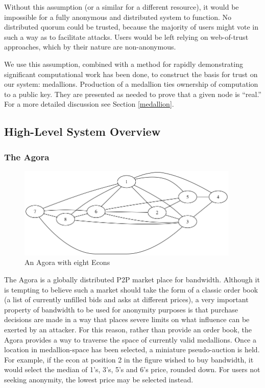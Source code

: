 \documentclass{article}
\begin{document}
Without this assumption (or a similar for a different resource), it would be impossible for a fully anonymous and distributed system to function. No distributed quorum could be trusted, because the majority of users might vote in such a way as to facilitate attacks. Users would be left relying on web-of-trust approaches, which by their nature are non-anonymous.

We use this assumption, combined with a method for rapidly demonstrating significant computational work has been done, to construct the basis for trust on our system: medallions. Production of a medallion ties ownership of computation to a public key. They are presented as needed to prove that a given node is “real.” For a more detailed discussion see Section \ref{medallion}.

\subsection{High-Level System Overview}

\subsubsection{The Agora}

\begin{figure}[htbp]
  \centering
  \includegraphics[width = 300pt]{agoraOverview}
  \caption{An Agora with eight Econs}
\end{figure}

The Agora is a globally distributed P2P market place for bandwidth. Although it is tempting to believe such a market should take the form of a classic order book (a list of currently unfilled bids and asks at different prices), a very important property of bandwidth to be used for anonymity purposes is that purchase decisions are made in a way that places severe limits on what influence can be exerted by an attacker. For this reason, rather than provide an order book, the Agora provides a way to traverse the space of currently valid medallions. Once a location in medallion-space has been selected, a miniature pseudo-auction is held. For example, if the econ at position 2 in the figure wished to buy bandwidth, it would select the median of 1’s, 3’s, 5’s and 6’s price, rounded down. For users not seeking anonymity, the lowest price may be selected instead.
\end{document}
